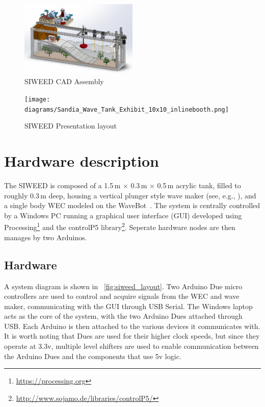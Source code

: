 \documentclass[11pt, letterpaper]{article}
\begin{document}
\begin{figure}[tb]
  \centering
  \includegraphics[width=0.5\textwidth]{diagrams/SIWEED_CAD.png}
  \caption{SIWEED CAD Assembly}
  \label{fig:CAD}
\end{figure}
\begin{figure}[tb]
  \centering
  \texttt{[image: diagrams/Sandia\_Wave\_Tank\_Exhibit\_10x10\_inlinebooth.png]}
  \caption{SIWEED Presentation layout}
  \label{fig:Exhibit}
\end{figure}

\section{Hardware description} %
The SIWEED is composed of a 1.5\,m $\times{}$ 0.3\,m $\times{}$ 0.5\,m acrylic tank, filled to roughly 0.3\,m deep, housing a vertical plunger style wave maker (see, e.g., \cite{hyun1976simplified}), and a single body WEC modeled on the WaveBot~\cite{Coe2016a}. 
The system is centrally controlled by a Windows PC running a graphical user interface (GUI) developed using Processing\footnote{\url{https://processing.org}} and the controlP5 library\footnote{\url{http://www.sojamo.de/libraries/controlP5/}}.
Seperate hardware nodes are then manages by two Arduinos.
\subsection{Hardware}
A system diagram is shown in \figurename~\ref{fig:siweed_layout}.
Two Arduino Due micro controllers are used to control and acquire signals from the WEC and wave maker, communicating with the GUI through USB Serial.
The Windows laptop acts as the core of the system, with the two Arduino Dues attached through USB. 
Each Arduino is then attached to the various devices it communicates with.
It is worth noting that Dues are used for their higher clock speeds, but since they operate at 3.3v, multiple level shifters are used to enable communication between the Arduino Dues and the components that use 5v logic.
\end{document}
